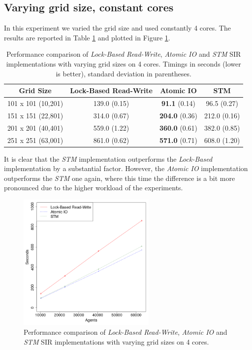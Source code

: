 \subsection{Varying grid size, constant cores}
In this experiment we varied the grid size and used constantly 4 cores. The results are reported in Table \ref{tab:sir_varyinggrid_constcores} and plotted in Figure \ref{fig:sir_varyinggrid_constcores}.

\begin{table}
	\centering
  	\begin{tabular}{ c || c | c | c  }
        Grid Size           & Lock-Based Read-Write & Atomic IO              & STM            \\ \hline \hline 
   		101 x 101 (10,201)  & 139.0 (0.15)          & \textbf{91.1} (0.14)   & 96.5 (0.27)    \\ \hline
   		151 x 151 (22,801)  & 314.0 (0.67)          & \textbf{204.0} (0.36)  & 212.0 (0.16)   \\ \hline
   		201 x 201 (40,401)  & 559.0 (1.22)          & \textbf{360.0} (0.61)  & 382.0 (0.85)   \\ \hline
   		251 x 251 (63,001)  & 861.0 (0.62)          & \textbf{571.0} (0.71)  & 608.0 (1.20)   \\ \hline \hline
  	\end{tabular}

  	\caption{Performance comparison of \textit{Lock-Based Read-Write}, \textit{Atomic IO} and \textit{STM} SIR implementations with varying grid sizes on 4 cores. Timings in seconds (lower is better), standard deviation in parentheses.}
	\label{tab:sir_varyinggrid_constcores} 
\end{table}

It is clear that the \textit{STM} implementation outperforms the \textit{Lock-Based} implementation by a substantial factor. However, the \textit{Atomic IO} implementation outperforms the \textit{STM} one again, where this time the difference is a bit more pronounced due to the higher workload of the experiments. 

\begin{figure}
	\centering
	\includegraphics[width=0.6\textwidth, angle=0]{./fig/concurrentabs/sir/sir_varyinggrid_constcores.png}
	\caption{Performance comparison of \textit{Lock-Based Read-Write}, \textit{Atomic IO} and \textit{STM} SIR implementations with varying grid sizes on 4 cores.}
	\label{fig:sir_varyinggrid_constcores}
\end{figure}


